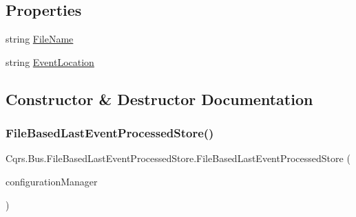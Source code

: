 \subsection*{Properties}
\begin{DoxyCompactItemize}
\item 
string \hyperlink{classCqrs_1_1Bus_1_1FileBasedLastEventProcessedStore_af58c18745fa63aaa92f3f1921d582068_af58c18745fa63aaa92f3f1921d582068}{File\+Name}
\item 
string \hyperlink{classCqrs_1_1Bus_1_1FileBasedLastEventProcessedStore_a98ea27c14b626c4c7bd5f2e5bb8ca7a4_a98ea27c14b626c4c7bd5f2e5bb8ca7a4}{Event\+Location}
\end{DoxyCompactItemize}


\subsection{Constructor \& Destructor Documentation}
\mbox{\label{classCqrs_1_1Bus_1_1FileBasedLastEventProcessedStore_a9e7f5bb54ffc9970f57e1712e9008e8a_a9e7f5bb54ffc9970f57e1712e9008e8a}} 
\subsubsection{\texorpdfstring{File\+Based\+Last\+Event\+Processed\+Store()}{FileBasedLastEventProcessedStore()}}
{\footnotesize\ttfamily Cqrs.\+Bus.\+File\+Based\+Last\+Event\+Processed\+Store.\+File\+Based\+Last\+Event\+Processed\+Store (\begin{DoxyParamCaption}\item[{\hyperlink{interfaceCqrs_1_1Configuration_1_1IConfigurationManager}{I\+Configuration\+Manager}}]{configuration\+Manager }\end{DoxyParamCaption})}



